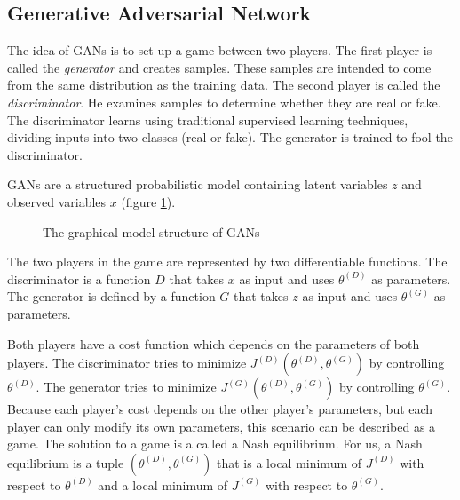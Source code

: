 \documentclass[12pt]{report}
\begin{document}
\subsection{Generative Adversarial Network}
\label{sec:back:gan}

The idea of GANs \cite{noauthor_gan_2017, goodfellow_generative_2016, goodfellow_generative_2014, goodfellow_nips_2017} is to set up a game between two players.
The first player is called the \textit{generator} and creates samples.
These samples are intended to come from the same distribution as the training data.
The second player is called the \textit{discriminator}.
He examines samples to determine whether they are real or fake.
The discriminator learns using traditional supervised learning techniques, dividing inputs into two classes (real or fake).
The generator is trained to fool the discriminator.

GANs are a structured probabilistic model containing latent variables $z$ and observed variables $x$ (figure \ref{fig:gan-latent-space}).

\begin{figure}[htbp]
\begin{center}
\caption{The graphical model structure of GANs}
\label{fig:gan-latent-space}
\end{center}
\end{figure}

The two players in the game are represented by two differentiable functions.
The discriminator is a function $D$ that takes $x$ as input and uses $\theta^{(D)}$ as parameters.
The generator is defined by a function $G$ that takes $z$ as input and uses $\theta^{(G)}$ as parameters.

Both players have a cost function which depends on the parameters of both players.
The discriminator tries to minimize $J^{(D)} (\theta^{(D)}, \theta^{(G)})$ by controlling $\theta^{(D)}$.
The generator tries to minimize $J^{(G)} (\theta^{(D)}, \theta^{(G)})$ by controlling $\theta^{(G)}$.
Because each player’s cost depends on the other player’s parameters, but each player can only modify its own parameters, this scenario can be described as a game.
The solution to a game is a called a Nash equilibrium.
For us, a Nash equilibrium is a tuple $(\theta^{(D)}, \theta^{(G)})$ that is a local minimum of $J^{(D)}$ with respect to $\theta^{(D)}$ and a local minimum of $J^{(G)}$ with respect to $\theta^{(G)}$.
\end{document}

